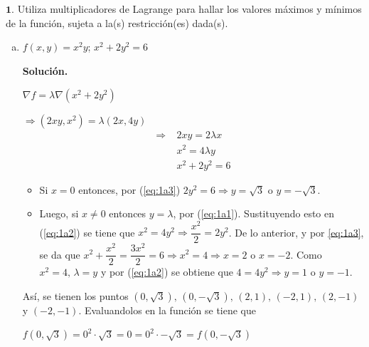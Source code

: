\documentclass[fleqn, 12pt]{article}
\begin{document}
\begin{list}{\bfseries Ejercicio}{ \addtolength{\itemindent}{-1mm}%
    \addtolength{\labelsep}{-1mm}%
    \addtolength{\leftmargin}{-1cm}%
    \addtolength{\labelwidth}{-1cm} }
    \item $ \mathbf{1.} $ Utiliza multiplicadores de Lagrange para hallar los valores máximos y mínimos de la función, sujeta a la(s) restricción(es) dada(s). 
    
    \begin{enumerate}[a)]
        \item $ f(x,y) = x^2 y $; \; $ x^2 + 2y^2 = 6 $
        
        \textbf{Solución.}

        $ \nabla f = \lambda \nabla (x^2 + 2y^2) $

        $ \Longrightarrow (2xy, x^2) = \lambda (2x, 4y) $
        \begin{align}
            \Longrightarrow \; & 2xy = 2 \lambda x \label{eq:1a1} \\
            & x^2 = 4 \lambda y \label{eq:1a2} \\
            & x^2 + 2y^2 = 6 \label{eq:1a3}
        \end{align}
        \begin{itemize}
            \item Si $ x = 0 $ entonces, por (\ref{eq:1a3}) $ 2y^2 = 6 \Longrightarrow y = \sqrt{3} $ o $ y = - \sqrt{3} $.
            \item Luego, si $ x \neq 0 $ entonces $ y = \lambda $, por (\ref{eq:1a1}). Sustituyendo esto en (\ref{eq:1a2}) se tiene que $ x^2 = 4y^2 \Longrightarrow \dfrac{x^2}{2} = 2y^2 $. De lo anterior, y por \ref{eq:1a3}, se da que $ x^2 + \dfrac{x^2}{2} = \dfrac{3x^2}{2} = 6 \Longrightarrow x^2 = 4 \Longrightarrow x = 2 $ o $ x = -2 $. Como $ x^2 = 4, \, \lambda = y $ y por (\ref{eq:1a2}) se obtiene que $ 4 = 4y^2 \Longrightarrow y = 1 $ o $ y = -1 $.
        \end{itemize}
        Así, se tienen los puntos $ \left( 0,\sqrt{3} \right), \, \left( 0,- \sqrt{3} \right), \, (2,1), \, (-2,1), \, (2,-1) $ y $ (-2,-1) $. Evaluandolos en la función se tiene que

        $ f \left( 0, \sqrt{3} \right) = 0^2 \cdot \sqrt{3} = 0 = 0^2 \cdot - \sqrt{3} = f \left( 0, - \sqrt{3} \right) $


\end{enumerate}
\end{list}
\end{document}
